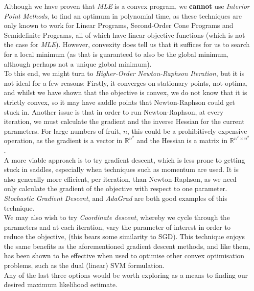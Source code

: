 Although we have proven that \textit{MLE} is a convex program, we \textbf{cannot} use \textit{Interior Point Methods}, to find an optimum in polynomial time, as these techniques are only known to work for Linear Programs, Second-Order Cone Programs and Semidefinite Programs\cite{nesterov1994interior}, all of which have linear objective functions (which is not the case for \textit{MLE}). However, convexity does tell us that it suffices for us to search for a local minimum (as that is guaranteed to also be the global minimum, although perhaps not a unique global minimum).\\[1em]

To this end, we might turn to \textit{Higher-Order Newton-Raphson Iteration}, but it is not ideal for a few reasons: Firstly, it converges on stationary points, not optima, and whilst we have shown that the objective is convex, we do not know that it is strictly convex, so it may have saddle points that Newton-Raphson could get stuck in. Another issue is that in order to run Newton-Raphson, at every iteration, we must calculate the gradient and the inverse Hessian for the current parameters. For large numbers of fruit, $n$, this could be a prohibitively expensive operation, as the gradient is a vector in $\mathbb{R}^{n^2}$ and the Hessian is a matrix in $\mathbb{R}^{n^2\times n^2}$.\\[1em]

A more viable approach is to try gradient descent, which is less prone to getting stuck in saddles, especially when techniques such as momentum are used. It is also generally more efficient, per iteration, than Newton-Raphson, as we need only calculate the gradient of the objective with respect to one parameter. \textit{Stochastic Gradient Descent}, and \textit{AdaGrad} are both good examples of this technique.\\[1em]

We may also wish to try \textit{Coordinate descent}, whereby we cycle through the parameters and at each iteration, vary the parameter of interest in order to reduce the objective, (this bears some similarity to SGD). This technique enjoys the same benefits as the aforementioned gradient descent methods, and like them, has been shown to be effective when used to optimise other convex optimisation problems, such as the dual (linear) SVM formulation\cite{hsieh2008dual}.\\[1em]

Any of the last three options would be worth exploring as a means to finding our desired maximum likelihood estimate.

